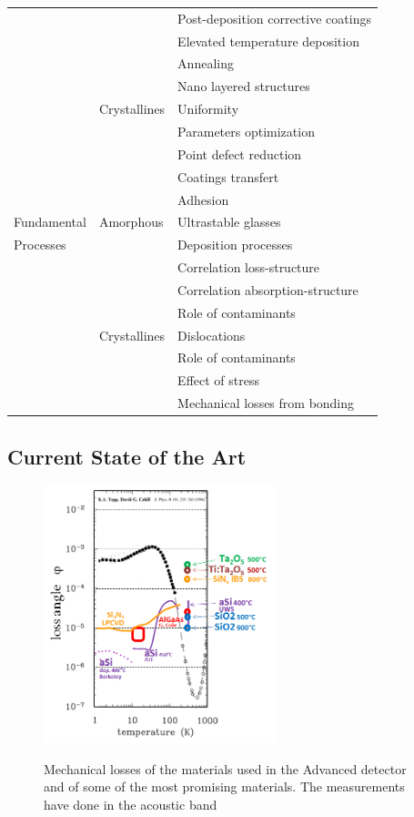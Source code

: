 \begin{longtable}{|p{}|p{}|p{}|}
 & & Post-deposition corrective coatings \\\cline{3-3}
 & & Elevated temperature deposition \\\cline{3-3}
 & & Annealing \\\cline{3-3}
 & & Nano layered structures \\\cline{2-3}
 & Crystallines & Uniformity \\\cline{3-3}
 & & Parameters optimization \\\cline{3-3}
 & & Point defect reduction \\\cline{3-3}
 & & Coatings transfert \\\cline{3-3}
 & & Adhesion \\\hline\hline
{\sc Fundamental} & Amorphous & Ultrastable glasses \\\cline{3-3}
{\sc Processes} & & Deposition processes \\\cline{3-3}
 & & Correlation loss-structure \\\cline{3-3}
 & & Correlation absorption-structure \\\cline{3-3}
 & & Role of contaminants \\\cline{2-3}
 & Crystallines & Dislocations \\\cline{3-3}
 & & Role of contaminants \\\cline{3-3}
 & & Effect of stress \\\cline{3-3}
 & & Mechanical losses from bonding \\\hline\hline
\end{longtable}
%
\subsection{Current State of the Art}
%
\begin{figure}[h]
\includegraphics[width=0.6\textwidth]{Figures/Status_coatings.png}
\label{fig:coatinglosstatus}
\caption{Mechanical losses of the materials used in the Advanced detector and of some of the most promising materials. The measurements have done in the acoustic band}
\end{figure}
%
